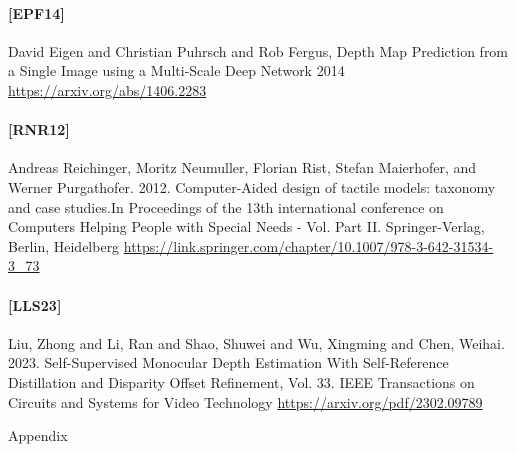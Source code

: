 \documentclass[12pt, letterpaper]{article}
\renewcommand{\appendix}{Appendix}
\begin{document}
\paragraph{[EPF14]}
\hypertarget{EPF14target}{}
David Eigen and Christian Puhrsch and Rob Fergus, Depth Map Prediction from a Single Image using a Multi-Scale Deep Network 2014\\
\href{https://arxiv.org/abs/1406.2283}{https://arxiv.org/abs/1406.2283}

\paragraph{[RNR12]}
\hypertarget{RNR12target}{}
Andreas Reichinger, Moritz Neumuller, Florian Rist, Stefan Maierhofer, and Werner Purgathofer. 2012.
Computer-Aided design of tactile models: taxonomy and case studies.In Proceedings of the 13th international conference on Computers Helping People with Special Needs - Vol. Part II. Springer-Verlag, Berlin, Heidelberg
\href{https://link.springer.com/chapter/10.1007/978-3-642-31534-3\_73}{https://link.springer.com/chapter/10.1007/978-3-642-31534-3\_73}

\paragraph{[LLS23]}
\hypertarget{LLS23target}{}
Liu, Zhong and Li, Ran and Shao, Shuwei and Wu, Xingming and Chen, Weihai. 2023.
Self-Supervised Monocular Depth Estimation With Self-Reference Distillation and Disparity Offset Refinement, Vol. 33. IEEE Transactions on Circuits and Systems for Video Technology
\href{https://arxiv.org/pdf/2302.09789}{https://arxiv.org/pdf/2302.09789}


\newpage


\appendix
{}
\end{document}
